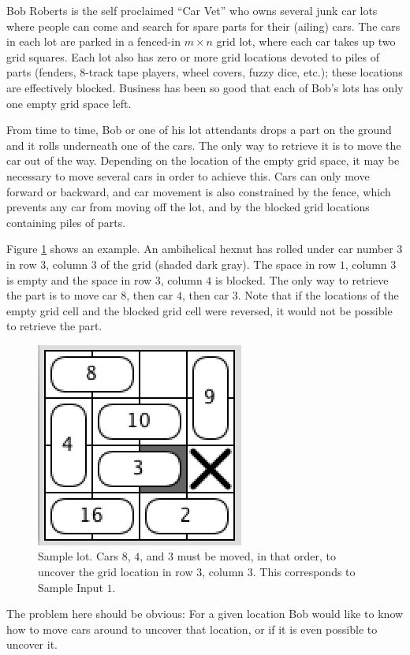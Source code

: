  Bob Roberts is the self proclaimed ``Car Vet'' who owns
several junk car lots where people can come and search for spare parts for
their (ailing) cars. The cars in each lot are parked in a fenced-in $m \times
n$ grid lot, where each car takes up two grid squares. Each lot also has zero or
more grid locations devoted to piles of parts (fenders, $8$-track tape players,
wheel covers, fuzzy dice, etc.); these locations are effectively blocked.
Business has been so good that each of Bob's lots has only one empty grid
space left.

From time to time, Bob or one of his lot attendants drops a part on the ground
and it rolls underneath one of the cars.
The only way to retrieve it is to move the car out of the way. 
Depending on the location of the empty grid space, it may be necessary to move
several cars in order to achieve this. Cars can only move forward or backward,
and car movement is also constrained by the fence, which prevents any
car from moving off the lot, and by the blocked grid locations containing
piles of parts.

Figure \ref{fig:sample1} shows an example. An ambihelical hexnut has rolled
under car number $3$ in row $3$, column $3$ of the grid (shaded dark gray).
The space in row $1$, column
$3$ is empty and the space in row $3$, column $4$ is blocked. The only way to 
retrieve the part is to move car $8$, then car $4$, then car $3$. Note that if the
locations of the empty grid cell and the blocked grid cell were reversed,
it would not be possible to retrieve the part.

\begin{figure}[!h]
\centering
\includegraphics[width=.25\linewidth]{sampleinput1.png}
\caption{Sample lot. Cars $8$, $4$, and $3$ must be moved, in that order, to
uncover the grid location in row $3$, column $3$. This corresponds to Sample
Input $1$.}
\label{fig:sample1}
\end{figure}

The problem here should be obvious: For a given location
Bob would
like to know how to move cars around to uncover that location, or
if it is even possible to uncover it.

